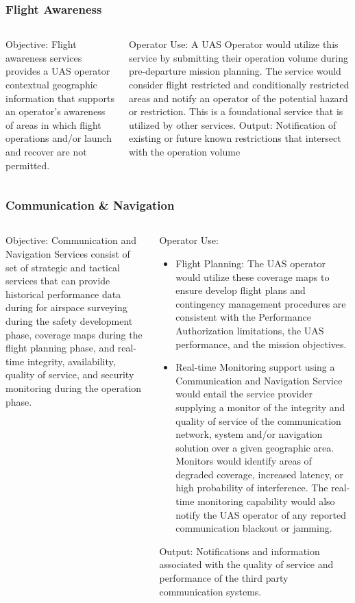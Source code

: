 \documentclass[usenames,dvipsnames,aspectratio=169,serif]{beamer}
\begin{document}
\begin{frame}
   \frametitle{Flight Awareness}
   \begin{columns}[t]
      \begin{column}{0.5\textwidth}
         Objective: Flight awareness services provides a UAS operator contextual geographic information that supports an operator’s awareness of areas in which flight operations and/or launch and recover are not permitted.
      \end{column}
      \begin{column}{0.5\textwidth}
         Operator Use: A UAS Operator would utilize this service by submitting their operation volume during pre-departure mission planning. The service would consider flight restricted and conditionally restricted areas and notify an operator of the potential hazard or restriction. This is a foundational service that is utilized by other services.
         Output: Notification of existing or future known restrictions that intersect with the operation volume
      \end{column}
   \end{columns}
\end{frame}

\begin{frame}
   \frametitle{Communication \& Navigation}
   \begin{columns}[t]
      \begin{column}{0.5\textwidth}
         Objective: Communication and Navigation Services consist of set of strategic and tactical services that can provide historical performance data during for airspace surveying during the safety development phase, coverage maps during the flight planning phase, and real-time integrity, availability, quality of service, and security monitoring during the operation phase.
      \end{column}
      \begin{column}{0.5\textwidth}
         Operator Use:
         \begin{itemize}
            \item  Flight Planning: The UAS operator would utilize these coverage maps to ensure develop flight plans and contingency management procedures are consistent with the Performance Authorization limitations, the UAS performance, and the mission objectives.
            \item  Real-time Monitoring support using a Communication and Navigation Service would entail the service provider supplying a monitor of the integrity and quality of service of the communication network, system and/or navigation solution over a given geographic area. Monitors would identify areas of degraded coverage, increased latency, or high probability of interference. The real-time monitoring capability would also notify the UAS operator of any reported communication blackout or jamming.
         \end{itemize}
         Output: Notifications and information associated with the quality of service and performance of the third party communication systems.
      \end{column}
   \end{columns}
\end{frame}
\end{document}
